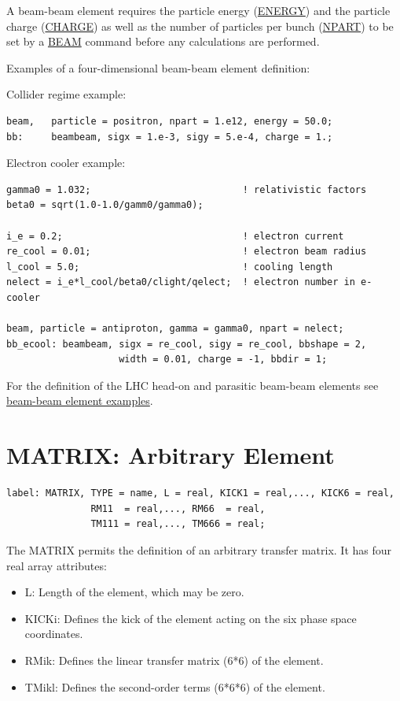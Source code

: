 A beam-beam element requires the particle energy
(\href{beam.html#energy}{ENERGY})
and the particle charge
(\href{beam.html#charge}{CHARGE})
as well as the number of particles per bunch 
(\href{beam.html#npart}{NPART})
to be set by a \href{beam.html}{BEAM} command
before any calculations are performed.


Examples of a four-dimensional beam-beam element definition:
 
Collider regime example:
\begin{verbatim}
beam,   particle = positron, npart = 1.e12, energy = 50.0;
bb:     beambeam, sigx = 1.e-3, sigy = 5.e-4, charge = 1.;
\end{verbatim}


Electron cooler example: 
\begin{verbatim}
gamma0 = 1.032;                           ! relativistic factors
beta0 = sqrt(1.0-1.0/gamm0/gamma0);

i_e = 0.2;                                ! electron current
re_cool = 0.01;                           ! electron beam radius
l_cool = 5.0;                             ! cooling length
nelect = i_e*l_cool/beta0/clight/qelect;  ! electron number in e-cooler

beam, particle = antiproton, gamma = gamma0, npart = nelect; 
bb_ecool: beambeam, sigx = re_cool, sigy = re_cool, bbshape = 2, 
                    width = 0.01, charge = -1, bbdir = 1;
\end{verbatim}

For the definition of the LHC head-on and parasitic beam-beam elements see 
 \href{../control/foot.html#macro}{beam-beam element examples}.


%
\section{MATRIX: Arbitrary Element}

\begin{verbatim}
label: MATRIX, TYPE = name, L = real, KICK1 = real,..., KICK6 = real,
               RM11  = real,..., RM66  = real,
               TM111 = real,..., TM666 = real;
\end{verbatim} 

The MATRIX permits the definition of an arbitrary transfer matrix. 
It has four real array attributes: 
\begin{itemize}
   \item L: Length of the element, which may be zero. 
   \item KICKi: Defines the kick of the element acting on the six phase
     space coordinates.  
   \item RMik: Defines the linear transfer matrix (6*6) of the element.  
   \item TMikl: Defines the second-order terms (6*6*6) of the element. 
\end{itemize} 


